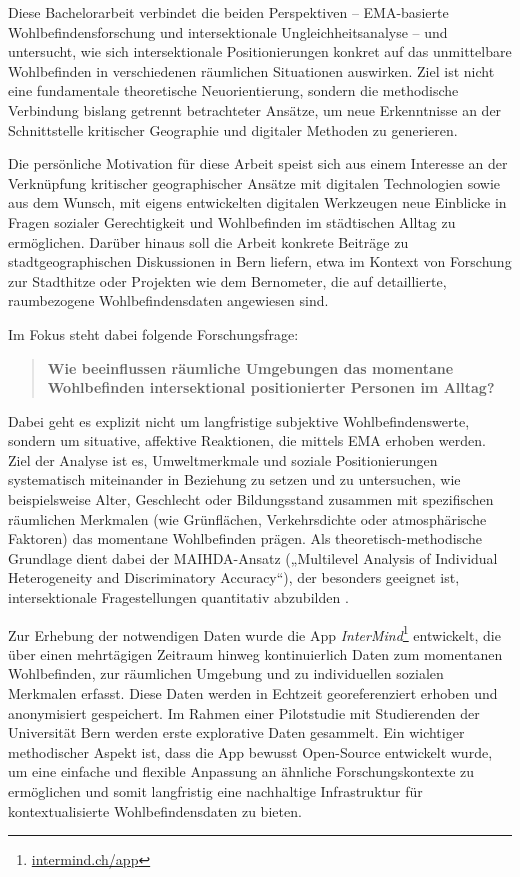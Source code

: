 Diese Bachelorarbeit verbindet die beiden Perspektiven – EMA-basierte Wohlbefindensforschung und intersektionale Ungleichheitsanalyse – und untersucht, wie sich intersektionale Positionierungen konkret auf das unmittelbare Wohlbefinden in verschiedenen räumlichen Situationen auswirken. Ziel ist nicht eine fundamentale theoretische Neuorientierung, sondern die methodische Verbindung bislang getrennt betrachteter Ansätze, um neue Erkenntnisse an der Schnittstelle kritischer Geographie und digitaler Methoden zu generieren. 

Die persönliche Motivation für diese Arbeit speist sich aus einem Interesse an der Verknüpfung kritischer geographischer Ansätze mit digitalen Technologien sowie aus dem Wunsch, mit eigens entwickelten digitalen Werkzeugen neue Einblicke in Fragen sozialer Gerechtigkeit und Wohlbefinden im städtischen Alltag zu ermöglichen. Darüber hinaus soll die Arbeit konkrete Beiträge zu stadtgeographischen Diskussionen in Bern liefern, etwa im Kontext von Forschung zur Stadthitze \parencite{burgerModellingSpatialPattern2021} oder Projekten wie dem Bernometer, die auf detaillierte, raumbezogene Wohlbefindensdaten angewiesen sind.

Im Fokus steht dabei folgende Forschungsfrage:

\begin{quote}
\textbf{Wie beeinflussen räumliche Umgebungen das momentane Wohlbefinden intersektional positionierter Personen im Alltag?}
\end{quote}

Dabei geht es explizit nicht um langfristige subjektive Wohlbefindenswerte, sondern um situative, affektive Reaktionen, die mittels EMA erhoben werden. Ziel der Analyse ist es, Umweltmerkmale und soziale Positionierungen systematisch miteinander in Beziehung zu setzen und zu untersuchen, wie beispielsweise Alter, Geschlecht oder Bildungsstand zusammen mit spezifischen räumlichen Merkmalen (wie Grünflächen, Verkehrsdichte oder atmosphärische Faktoren) das momentane Wohlbefinden prägen. Als theoretisch-methodische Grundlage dient dabei der MAIHDA-Ansatz („Multilevel Analysis of Individual Heterogeneity and Discriminatory Accuracy“), der besonders geeignet ist, intersektionale Fragestellungen quantitativ abzubilden \parencite{grossModellingIntersectionalityQuantitative2023}.

Zur Erhebung der notwendigen Daten wurde die App \emph{InterMind}\footnote{\href{https://intermind.ch/app}{intermind.ch/app}} entwickelt, die über einen mehrtägigen Zeitraum hinweg kontinuierlich Daten zum momentanen Wohlbefinden, zur räumlichen Umgebung und zu individuellen sozialen Merkmalen erfasst. Diese Daten werden in Echtzeit georeferenziert erhoben und anonymisiert gespeichert. Im Rahmen einer Pilotstudie mit Studierenden der Universität Bern werden erste explorative Daten gesammelt. Ein wichtiger methodischer Aspekt ist, dass die App bewusst Open-Source entwickelt wurde, um eine einfache und flexible Anpassung an ähnliche Forschungskontexte zu ermöglichen und somit langfristig eine nachhaltige Infrastruktur für kontextualisierte Wohlbefindensdaten zu bieten.

